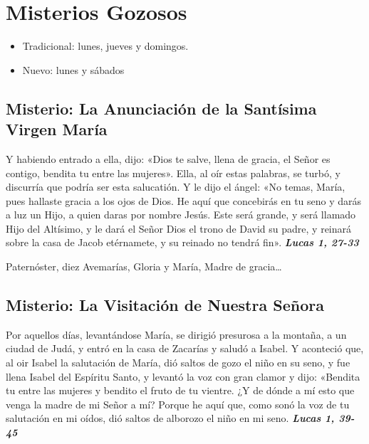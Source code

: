 \documentclass[./rosary.tex]{subfiles}
\newcounter{joyful-counter}
\begin{document}
\section*{Misterios Gozosos}

\begin{itemize}
      \item Tradicional: lunes, jueves y domingos.
      \item Nuevo: lunes y sábados
\end{itemize}

\subsection*{ Misterio: La Anunciación de la Santísima Virgen María}
Y habiendo entrado a ella, dijo: «Dios te salve, llena de gracia, el Señor es contigo, bendita tu entre las mujeres».
Ella, al oír estas palabras, se turbó, y discurría que podría ser esta salucatión. Y le dijo el ángel: «No temas, María,
pues hallaste gracia a los ojos de Dios. He aquí que concebirás en tu seno y darás a luz un Hijo, a quien daras por
nombre Jesús. Este será grande, y será llamado Hijo del Altísimo, y le dará el Señor Dios el trono de David su padre,
y reinará sobre la casa de Jacob etérnamete, y su reinado no tendrá fin». \textbf{\emph{Lucas 1, 27-33}}

\begin{center}
      Paternóster, diez Avemarías, Gloria y María, Madre de gracia{\ldots}
\end{center}
\bigskip

\subsection*{ Misterio: La Visitación de Nuestra Señora}

Por aquellos días, levantándose María, se dirigió presurosa a la montaña, a un ciudad de Judá, y entró en la casa de Zacarías y saludó a Isabel.
Y aconteció que, al oir Isabel la salutación de María, dió saltos de gozo el niño en su seno, y fue llena Isabel del Espíritu Santo,
y levantó la voz con gran clamor y dijo: «Bendita tu entre las mujeres y bendito el fruto de tu vientre. ¿Y de dónde a mí esto que venga la madre de mi Señor a mí?
Porque he aquí que, como sonó la voz de tu salutación en mi oídos, dió saltos de alborozo el niño en mi seno. 
\textbf{\emph{Lucas 1, 39-45}}
\end{document}
